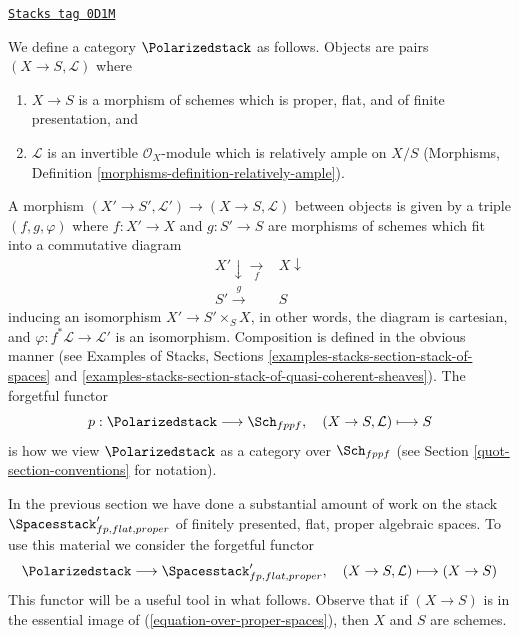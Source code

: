 \begin{definition}
\label{quot-situation-polarized}
\href{https://stacks.math.columbia.edu/tag/0D1M}{\texttt{Stacks tag 0D1M}}

We define a category $\Polarizedstack$ as follows. Objects are
pairs $(X \to S, \mathcal{L})$ where
\begin{enumerate}
\item $X \to S$ is a morphism of schemes which is proper, flat, and
of finite presentation, and
\item $\mathcal{L}$ is an invertible $\mathcal{O}_X$-module
which is relatively ample on $X/S$
(Morphisms, Definition \ref{morphisms-definition-relatively-ample}).
\end{enumerate}
A morphism $(X' \to S', \mathcal{L}') \to (X \to S, \mathcal{L})$
between objects
is given by a triple $(f, g, \varphi)$ where $f : X' \to X$ and $g : S' \to S$
are morphisms of schemes which fit into a commutative diagram
$$
\begin{array}{cc}X' \downarrow\underset{f}{\longrightarrow} & X \downarrow \\ S' \overset{g}{\longrightarrow} & S\end{array}
$$
inducing an isomorphism $X' \to S' \times_S X$, in other words, the
diagram is cartesian,
and $\varphi : f^*\mathcal{L} \to \mathcal{L}'$ is an isomorphism.
Composition is defined in the obvious manner (see
Examples of Stacks, Sections
\ref{examples-stacks-section-stack-of-spaces} and
\ref{examples-stacks-section-stack-of-quasi-coherent-sheaves}).
The forgetful functor
$$
p : \Polarizedstack \longrightarrow \Sch_{fppf},\quad
(X \to S, \mathcal{L}) \longmapsto S
$$
is how we view $\Polarizedstack$ as a category over $\Sch_{fppf}$
(see Section \ref{quot-section-conventions} for notation).
\end{definition}

In the previous section we have done a substantial amount of work on the stack
$\Spacesstack'_{fp, flat, proper}$
of finitely presented, flat, proper algebraic spaces. To use this material
we consider the forgetful functor
\begin{equation}
\label{equation-over-proper-spaces}
\Polarizedstack \longrightarrow
\Spacesstack'_{fp, flat, proper},\quad
(X \to S, \mathcal{L}) \longmapsto (X \to S)
\end{equation}
This functor will be a useful tool in what follows.
Observe that if $(X \to S)$ is in the essential image
of (\ref{equation-over-proper-spaces}), then
$X$ and $S$ are schemes.

